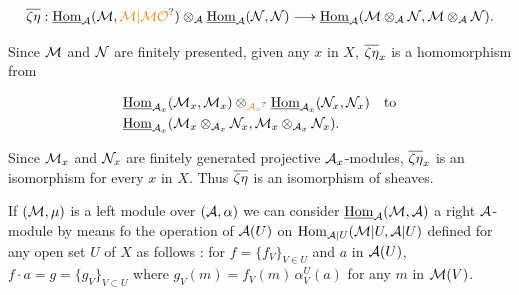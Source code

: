 
\[
\handwritten{\overline{\zeta\eta}}: \underline{\mathrm{Hom}}_{\handwritten{\mathcal{A}}}(\handwritten{\mathcal{M}},\handwritten{\unsure{\mathcal{M}|\mathcal{M}\mathcal{O}}})\otimes_{\handwritten{\mathcal{A}}}\underline{\mathrm{Hom}}_{\handwritten{\mathcal{A}}}(\handwritten{\mathcal{N}},\handwritten{\mathcal{N}})\longrightarrow \underline{\mathrm{Hom}}_{\handwritten{\mathcal{A}}}(\handwritten{\mathcal{M}}\otimes_{\handwritten{\mathcal{A}}}\handwritten{\mathcal{N}},\handwritten{\mathcal{M}}\otimes_{\handwritten{\mathcal{A}}}\handwritten{\mathcal{N}}).
\]

Since $\mathcal{M}$ and $\mathcal{N}$ are finitely presented, given any $x$ in $X$, $\overline{\zeta\eta}_x$ is
a homomorphism from

\[
\begin{aligned}
&\underline{\mathrm{Hom}}_{\handwritten{\mathcal{A}}_x}(\handwritten{\mathcal{M}}_x,\handwritten{\mathcal{M}}_x)\handwritten{\otimes}_{\handwritten{\unsure{\mathcal A_x}}}\underline{\mathrm{Hom}}_{\handwritten{\mathcal{A}}_x}(\handwritten{\mathcal{N}}_x,\handwritten{\mathcal{N}}_x)\quad\text{to}\\
&\underline{\mathrm{Hom}}_{\handwritten{\mathcal{A}}_x}(\handwritten{\mathcal{M}}_x\handwritten{\otimes}_{\handwritten{\mathcal A_x}}\handwritten{\mathcal{N}}_x,\handwritten{\mathcal{M}}_x\handwritten{\otimes}_{\handwritten{\mathcal A_x}}\handwritten{\mathcal{N}}_x).
\end{aligned}
\]

Since $\mathcal{M}_x$ and $\mathcal{N}_x$ are finitely generated projective $\mathcal{A}_x$-modules,
$\overline{\zeta\eta}_x$ is an isomorphism for every $x$ in $X$. Thus $\overline{\zeta\eta}$ is an isomorphism of sheaves.

If $(\mathcal{M},\mu)$ is a left module over $(\mathcal{A},\alpha)$ we can consider
$\underline{\mathrm{Hom}}_{\mathcal{A}}(\mathcal{M},\mathcal{A})$ a right $\mathcal{A}$-module by means fo the operation of
$\mathcal{A}(U)$ on $\mathrm{Hom}_{\mathcal{A}|U}(\mathcal{M}|U,\mathcal{A}|U)$ defined for any open set $U$ of $X$
as follows : for $f=\{f_V\}_{V\in U}$ and $a$ in $\mathcal{A}(U)$, $f\cdot a=g=\{g_V\}_{V\subset U}$
where $g_V(m)=f_V(m)\,\alpha^U_V(a)$ for any $m$ in $\mathcal{M}(V)$.

